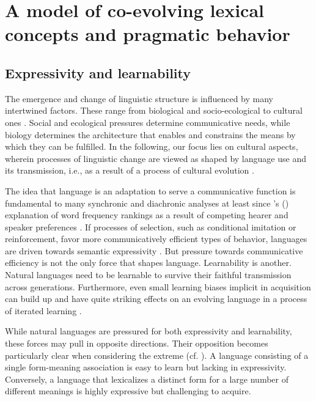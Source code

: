 \documentclass[a4paper, 11pt]{article}
\theoremstyle{Satz}
\newcommand{\citeposs}[2][]{\citeauthor{#2}'s (\citeyear[#1]{#2})}
\begin{document}
\section{A model of co-evolving lexical concepts and pragmatic behavior}
\label{sec:model}

\subsection{Expressivity and learnability}

The emergence and change of linguistic structure is influenced by many intertwined
factors. These range from biological and socio-ecological to cultural ones \citep{benz+etal:2005b,steels:2011,tamariz+kirby:2016}. Social and ecological pressures determine communicative needs, while
biology determines the architecture that enables and constrains the means by which they can be
fulfilled. In the following, our focus lies on cultural aspects, wherein processes of
linguistic change are viewed as shaped by language use and its transmission, i.e., as a result
of a process of cultural evolution
\citep{Pagel2009:Human-Language-,ThompsonKirby2016:Culture-Shapes-}.

The idea that language is an adaptation to serve a communicative function is fundamental to
many synchronic and diachronic analyses at least since \citeposs{zipf:1949} explanation of word
frequency rankings as a result of competing hearer and speaker preferences \citep[e.g.,
in][]{martinet:1962, horn:1984,jaeger+vRooij:2007,jaeger:2007,
  piantadosi:2014,kirby+etal:2015}. If processes of selection, such as conditional imitation or
reinforcement, favor more communicatively efficient types of behavior, languages are driven
towards semantic expressivity \citep[e.g.,][]{nowak+krakauer:1999,Skyrms2010:Signals}. But
pressure towards communicative efficiency is not the only force that shapes
language. Learnability is another. Natural languages need to be learnable to survive their
faithful transmission across generations. Furthermore, even small learning biases implicit in acquisition
can build up and have quite striking effects on an evolving language in a process of iterated
learning
\citep{KirbyHurford2002:The-Emergence-o,SmithKirby2003:Iterated-Learni,kirby+etal:2014}.

While natural languages are pressured for both expressivity and learnability, these forces may
pull in opposite directions. Their opposition becomes particularly clear when considering the
extreme (cf. \citealt{kemp+regier:2012,kirby+etal:2015}). A language consisting of a single
form-meaning association is easy to learn but lacking in expressivity. Conversely, a language
that lexicalizes a distinct form for a large number of different meanings is highly expressive
but challenging to acquire.
\end{document}
